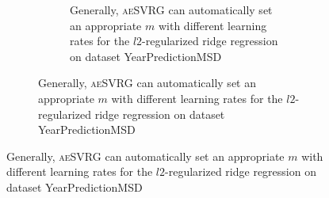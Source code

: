 \documentclass[conference]{IEEEtran}
\begin{document}
\begin{algorithm}[t]
\begin{itemize}
\begin{figure}[ht]
\begin{figure}[ht]
\begin{figure}[ht]
\caption{Generally, \textsc{aeSVRG} can automatically set an appropriate $m$ with different learning rates for the $l2$-regularized ridge regression on dataset YearPredictionMSD}
\label{figure_ridge_Year}
\end{figure}


\end{figure}
\end{figure}
\end{itemize}
\end{algorithm}
\end{document}
